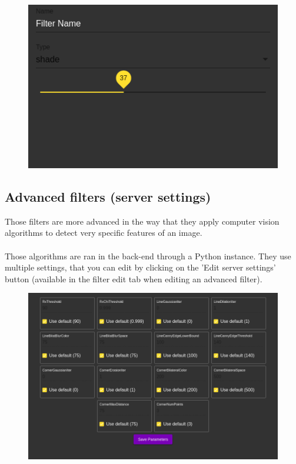 \documentclass[12pt,a4paper]{article}
\begin{document}
\begin{figure}[H]
	\includegraphics[scale=0.47]{simple_filter_edit}
	\centering
\end{figure}

\subsection{Advanced filters (server settings)}

Those filters are more advanced in the way that they apply computer vision algorithms to detect very specific features of an image.\\
~\\
Those algorithms are ran in the back-end through a Python instance. They use multiple settings, that you can edit by clicking on the 'Edit server settings' button (available in the filter edit tab when editing an advanced filter).\\

\begin{figure}[H]
	\includegraphics[scale=0.4]{advanced_settings}
	\centering
\end{figure}
\end{document}
